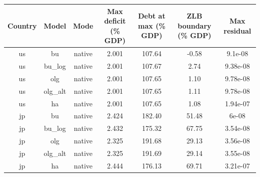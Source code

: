 \begin{table}[!ht]
\setlength\tabcolsep{0.425em}
\setlength\aboverulesep{0pt}
\setlength\belowrulesep{0.2em}
\centering
\begin{threeparttable}
\begin{tabular}{ccccccc}
\toprule[0.1em]
Country & Model & Mode & Max deficit (\% GDP) & Debt at max (\% GDP) & ZLB boundary (\% GDP) & Max residual \\[0.2em]
\midrule[0.075em]
us & bu & native & 2.001 & 107.64 & -0.58 & 9.1e-08 \\[0.2em]
us & bu\_log & native & 2.001 & 107.67 & 2.74 & 9.38e-08 \\[0.2em]
us & olg & native & 2.001 & 107.65 & 1.10 & 9.78e-08 \\[0.2em]
us & olg\_alt & native & 2.001 & 107.65 & 1.11 & 9.78e-08 \\[0.2em]
us & ha & native & 2.001 & 107.65 & 1.08 & 1.94e-07 \\[0.2em]
jp & bu & native & 2.424 & 182.40 & 51.48 & 6e-08 \\[0.2em]
jp & bu\_log & native & 2.432 & 175.32 & 67.75 & 3.54e-08 \\[0.2em]
jp & olg & native & 2.325 & 191.68 & 29.13 & 3.56e-08 \\[0.2em]
jp & olg\_alt & native & 2.325 & 191.69 & 29.14 & 3.55e-08 \\[0.2em]
jp & ha & native & 2.444 & 176.13 & 69.71 & 3.21e-07 \\[0.2em]
\bottomrule[0.1em]
\end{tabular}
\end{threeparttable}
\end{table}
